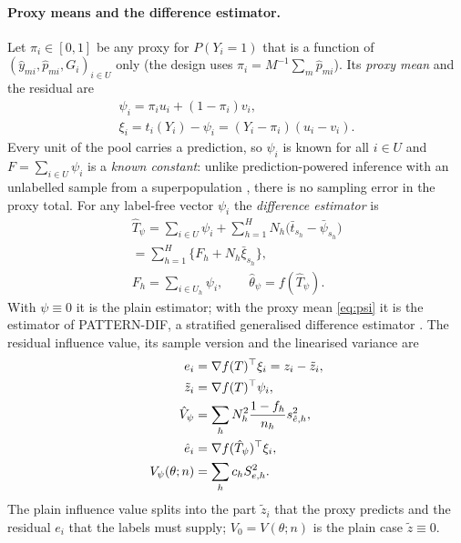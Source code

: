 \paragraph{Proxy means and the difference estimator.} Let $\pi_i\in[0,1]$ be any proxy for $P(Y_i=1)$
that is a function of $(\hat y_{mi},\hat p_{mi},G_i)_{i\in U}$ only (the design uses
$\pi_i=M^{-1}\sum_m\hat p_{mi}$). Its \emph{proxy mean} and the residual are
\begin{equation}\label{eq:psi}
\begin{gathered}
\psi_i=\pi_iu_i+(1-\pi_i)v_i,\\
\xi_i=t_i(Y_i)-\psi_i=(Y_i-\pi_i)(u_i-v_i).
\end{gathered}
\end{equation}
Every unit of the pool carries a prediction, so $\psi_i$ is known for all $i\in U$ and $F=\sum_{i\in U}\psi_i$ is a
\emph{known constant}: unlike prediction-powered inference with an unlabelled sample from a superpopulation
\citep{angelopoulos2023ppi,angelopoulos2026ppipp}, there is no sampling error in the proxy total. For any label-free
vector $\psi_i$ the \emph{difference estimator} is
\begin{equation}\label{eq:dif}
\begin{gathered}
\hat T_\psi=\sum_{i\in U}\psi_i+\sum_{h=1}^HN_h\big(\bar t_{s_h}-\bar\psi_{s_h}\big)\\
=\sum_{h=1}^H\big\{F_h+N_h\bar\xi_{s_h}\big\},\\
F_h=\sum_{i\in U_h}\psi_i,\qquad
\hat\theta_\psi=f(\hat T_\psi).
\end{gathered}
\end{equation}
With $\psi\equiv0$ it is the plain estimator; with the proxy mean \eqref{eq:psi} it is the estimator of PATTERN-DIF, a
stratified generalised difference estimator \citep{cassel1976,sarndal1992}. The residual influence value, its
sample version and the linearised variance are
\begin{align}
e_i&=\nabla f(T)^{\top}\xi_i=z_i-\tilde z_i,\notag\\
\tilde z_i&=\nabla f(T)^{\top}\psi_i,\notag\\
\hat V_\psi&=\sum_hN_h^2\frac{1-f_h}{n_h}s^2_{\hat e,h},\notag\\
\hat e_i&=\nabla f(\hat T_\psi)^{\top}\xi_i,\notag\\
V_\psi(\theta;n)&=\sum_hc_hS^2_{e,h}.\label{eq:resid}
\end{align}
The plain influence value splits into the part $\tilde z_i$ that the proxy predicts and the residual $e_i$ that
the labels must supply; $V_0=V(\theta;n)$ is the plain case $\tilde z\equiv0$.

